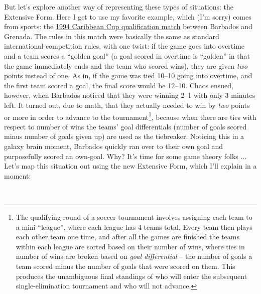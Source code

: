 But let's explore another way of representing these types of situations: the Extensive Form. Here I get to use my favorite example, which (I'm sorry) comes from sports: the \href{https://en.wikipedia.org/wiki/Barbados_4\%E2\%80\%932_Grenada_(1994_Caribbean_Cup_qualification)}{1994 Caribbean Cup qualification match} between Barbados and Grenada. The rules in this match were basically the same as standard international-competition rules, with one twist: if the game goes into overtime and a team scores a ``golden goal'' (a goal scored in overtime is ``golden'' in that the game immediately ends and the team who scored wins), they are given \textit{two} points instead of one. As in, if the game was tied 10--10 going into overtime, and the first team scored a goal, the final score would be 12--10. Chaos ensued, however, when Barbados noticed that they were winning 2--1 with only 3 minutes left. It turned out, due to math, that they actually needed to win by \textit{two} points or more in order to advance to the tournament\footnote{The qualifying round of a soccer tournament involves assigning each team to a mini-``league'', where each league has 4 teams total. Every team then plays each other team one time, and after all the games are finished the teams within each league are sorted based on their number of wins, where ties in number of wins are broken based on \textit{goal differential} -- the number of goals a team scored minus the number of goals that were scored on them. This produces the unambiguous final standings of who will enter the subsequent single-elimination tournament and who will not advance.}, because when there are ties with respect to number of wins the teams' goal differentials (number of goals scored minus number of goals given up) are used as the tiebreaker. Noticing this in a galaxy brain moment, Barbados quickly ran over to their own goal and purposefully scored an own-goal. Why? It's time for some game theory folks $\ldots$ Let's map this situation out using the new Extensive Form, which I'll explain in a moment:

~\\


